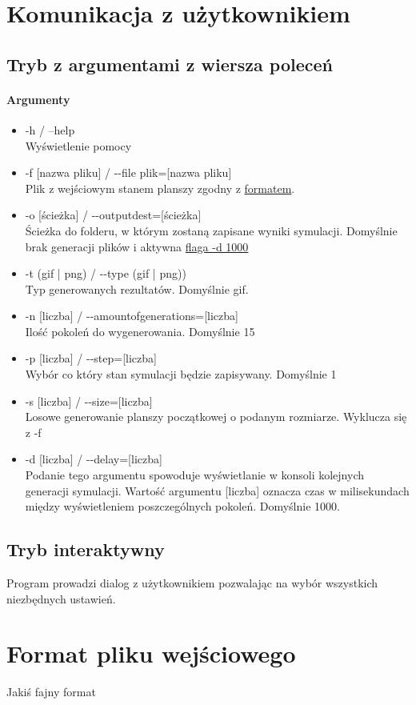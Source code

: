 \documentclass{report}
\begin{document}
\section{Komunikacja z użytkownikiem}

\subsection{Tryb z argumentami z wiersza poleceń}
\paragraph{Argumenty}
\begin{itemize}
\item -h / --help \\ Wyświetlenie pomocy
\item -f [nazwa pliku]  / -{}-file plik=[nazwa pliku] \\ Plik z wejściowym stanem planszy zgodny z \hyperref[format]{formatem}. %
\item -o [ścieżka] / -{}-output\textunderscore{}dest=[ścieżka]  \\Ścieżka do folderu, w którym zostaną zapisane wyniki symulacji. Domyślnie brak generacji plików i aktywna \hyperref[delay]{flaga -d 1000}
\item -t (gif | png) / -{}-type (gif | png)) \\Typ generowanych rezultatów. Domyślnie gif.
\item -n [liczba] / -{}-amount\textunderscore{}of\textunderscore{}generations=[liczba] \\ Ilość pokoleń do wygenerowania. Domyślnie 15
\item -p [liczba] / -{}-step=[liczba] \\ Wybór co który stan symulacji będzie zapisywany. Domyślnie 1
\item -s [liczba] / -{}-size=[liczba] \\ Losowe generowanie planszy początkowej o podanym rozmiarze. Wyklucza się z -f
\item \label{delay} -d [liczba] / -{}-delay=[liczba] \\ Podanie tego argumentu spowoduje wyświetlanie w konsoli kolejnych generacji symulacji. Wartość argumentu [liczba] oznacza czas  w milisekundach między wyświetleniem poszczególnych pokoleń. Domyślnie 1000.
\end{itemize}

\subsection{Tryb interaktywny}
Program prowadzi dialog z użytkownikiem pozwalając na wybór wszystkich niezbędnych ustawień.

\section{Format pliku wejściowego} 
\label{format}
Jakiś fajny format
\end{document}
